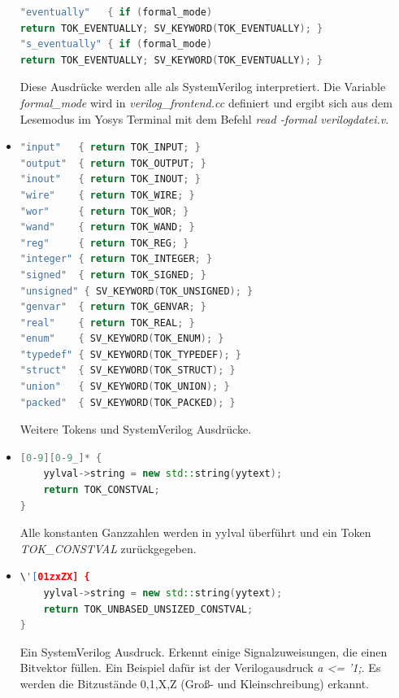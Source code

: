 \documentclass[11pt]{report}
\begin{document}
\begin{itemize}
\begin{lstlisting}[language=C++]
"eventually"   { if (formal_mode) 
return TOK_EVENTUALLY; SV_KEYWORD(TOK_EVENTUALLY); }
"s_eventually" { if (formal_mode) 
return TOK_EVENTUALLY; SV_KEYWORD(TOK_EVENTUALLY); }
\end{lstlisting}

Diese Ausdrücke werden alle als SystemVerilog interpretiert. Die Variable \textit{formal\_mode} wird in \textit{verilog\_frontend.cc} definiert und ergibt sich aus dem Lesemodus im Yosys Terminal mit dem Befehl \textit{read -formal verilogdatei.v}.

\item
\begin{lstlisting}[language=C++]
"input"   { return TOK_INPUT; }
"output"  { return TOK_OUTPUT; }
"inout"   { return TOK_INOUT; }
"wire"    { return TOK_WIRE; }
"wor"     { return TOK_WOR; }
"wand"    { return TOK_WAND; }
"reg"     { return TOK_REG; }
"integer" { return TOK_INTEGER; }
"signed"  { return TOK_SIGNED; }
"unsigned" { SV_KEYWORD(TOK_UNSIGNED); }
"genvar"  { return TOK_GENVAR; }
"real"    { return TOK_REAL; }
"enum"    { SV_KEYWORD(TOK_ENUM); }
"typedef" { SV_KEYWORD(TOK_TYPEDEF); }
"struct"  { SV_KEYWORD(TOK_STRUCT); }
"union"   { SV_KEYWORD(TOK_UNION); }
"packed"  { SV_KEYWORD(TOK_PACKED); }	
\end{lstlisting}

Weitere Tokens und SystemVerilog Ausdrücke.

\item
\begin{lstlisting}[language=C++]
[0-9][0-9_]* {
	yylval->string = new std::string(yytext);
	return TOK_CONSTVAL;
}
\end{lstlisting}
Alle konstanten Ganzzahlen werden in yylval überführt und ein Token \textit{TOK\_CONSTVAL} zurückgegeben.
\item
\begin{lstlisting}[language=C++]
\'[01zxZX] {
	yylval->string = new std::string(yytext);
	return TOK_UNBASED_UNSIZED_CONSTVAL;
}
\end{lstlisting}
Ein SystemVerilog Ausdruck. Erkennt einige Signalzuweisungen, die einen Bitvektor füllen. Ein Beispiel dafür ist der Verilogausdruck \textit{a \textless= '1;}. Es werden die Bitzustände 0,1,X,Z (Groß- und Kleinschreibung) erkannt.


\end{itemize}
\end{document}
